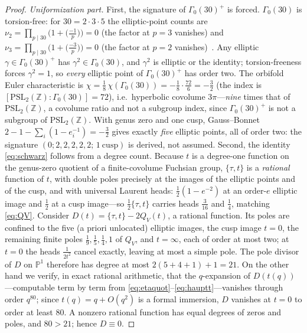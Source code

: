 \documentclass[cntp]{ipart}
\theoremstyle{plain}
\theoremstyle{remark}
\begin{document}
\begin{proof}
\emph{Uniformization part.} First, the signature of $\Gamma_0(30)^+$ is forced. $\Gamma_0(30)$ is
torsion-free: for $30=2\cdot3\cdot5$ the elliptic-point counts are
$\nu_2=\prod_{p\mid30}\big(1+\big(\tfrac{-1}{p}\big)\big)=0$ (the factor at $p=3$ vanishes) and
$\nu_3=\prod_{p\mid30}\big(1+\big(\tfrac{-3}{p}\big)\big)=0$ (the factor at $p=2$
vanishes)~\cite{DiamondShurman}. Any elliptic $\gamma\in\Gamma_0(30)^+$ has $\gamma^2\in\Gamma_0(30)$, and
$\gamma^2$ is elliptic or the identity; torsion-freeness forces $\gamma^2=1$, so \emph{every} elliptic point
of $\Gamma_0(30)^+$ has order two. The orbifold Euler characteristic is
$\chi=\tfrac18\,\chi(\Gamma_0(30))=-\tfrac18\cdot\tfrac{72}{6}=-\tfrac32$ (the index is
$[\mathrm{PSL}_2(\mathbb{Z}):\Gamma_0(30)]=72$), i.e.\ hyperbolic covolume $3\pi$---\emph{nine} times that of
$\mathrm{PSL}_2(\mathbb{Z})$, a covolume ratio and not a subgroup index, since $\Gamma_0(30)^+$ is not a
subgroup of $\mathrm{PSL}_2(\mathbb{Z})$. With genus zero and one cusp, Gauss--Bonnet
$2-1-\sum_i(1-e_i^{-1})=-\tfrac32$ gives exactly \emph{five} elliptic points, all of order two: the signature
$(0;2,2,2,2,2;\,1\ \mathrm{cusp})$ is derived, not assumed. Second, the identity \eqref{eq:schwarz} follows
from a degree count. Because $t$ is a degree-one function on the genus-zero quotient of a finite-covolume
Fuchsian group, $\{\tau,t\}$ is a
\emph{rational} function of $t$, with double poles precisely at the images of the elliptic points and of the
cusp, and with universal Laurent heads: $\tfrac12(1-e^{-2})$ at an order-$e$ elliptic image and $\tfrac12$ at
a cusp image---so $\tfrac12\{\tau,t\}$ carries heads $\tfrac3{16}$ and $\tfrac14$, matching \eqref{eq:QV}.
Consider $D(t)=\{\tau,t\}-2Q_V(t)$, a rational function. Its poles are confined to the five (a priori
unlocated) elliptic images, the cusp image $t=0$, the remaining finite poles $\tfrac19,\tfrac15,\tfrac14,1$ of
$Q_V$, and $t=\infty$, each of order at most two; at $t=0$ the heads $\tfrac1{2t^2}$ cancel exactly, leaving
at most a simple pole. The pole divisor of $D$ on $\mathbb{P}^1$ therefore has degree at most
$2(5+4+1)+1=21$. On the other hand we verify, in exact rational arithmetic, that the $q$-expansion of
$D(t(q))$---computable term by term from \eqref{eq:etaquot}--\eqref{eq:hauptt}---vanishes through order
$q^{80}$; since $t(q)=q+O(q^2)$ is a formal immersion, $D$ vanishes at $t=0$ to order at least $80$. A nonzero
rational function has equal degrees of zeros and poles, and $80>21$; hence $D\equiv0$.
\end{proof}
\end{document}
